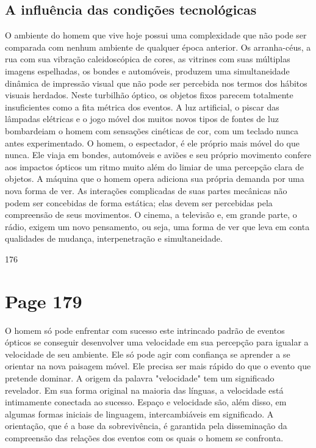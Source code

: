 \documentclass[a4paper]{article}
\begin{document}
\subsection*{A influência das condições tecnológicas}

O ambiente do homem que vive hoje possui uma complexidade que não pode ser comparada com nenhum ambiente de qualquer época anterior. Os arranha-céus, a rua com sua vibração caleidoscópica de cores, as vitrines com suas múltiplas imagens espelhadas, os bondes e automóveis, produzem uma simultaneidade dinâmica de impressão visual que não pode ser percebida nos termos dos hábitos visuais herdados. Neste turbilhão óptico, os objetos fixos parecem totalmente insuficientes como a fita métrica dos eventos. A luz artificial, o piscar das lâmpadas elétricas e o jogo móvel dos muitos novos tipos de fontes de luz bombardeiam o homem com sensações cinéticas de cor, com um teclado nunca antes experimentado. O homem, o espectador, é ele próprio mais móvel do que nunca. Ele viaja em bondes, automóveis e aviões e seu próprio movimento confere aos impactos ópticos um ritmo muito além do limiar de uma percepção clara de objetos. A máquina que o homem opera adiciona sua própria demanda por uma nova forma de ver. As interações complicadas de suas partes mecânicas não podem ser concebidas de forma estática; elas devem ser percebidas pela compreensão de seus movimentos. O cinema, a televisão e, em grande parte, o rádio, exigem um novo pensamento, ou seja, uma forma de ver que leva em conta qualidades de mudança, interpenetração e simultaneidade.

176

\newpage
\section*{Page 179}

O homem só pode enfrentar com sucesso este intrincado padrão de eventos ópticos se conseguir desenvolver uma velocidade em sua percepção para igualar a velocidade de seu ambiente. Ele só pode agir com confiança se aprender a se orientar na nova paisagem móvel. Ele precisa ser mais rápido do que o evento que pretende dominar. A origem da palavra "velocidade" tem um significado revelador. Em sua forma original na maioria das línguas, a velocidade está intimamente conectada ao sucesso. Espaço e velocidade são, além disso, em algumas formas iniciais de linguagem, intercambiáveis em significado. A orientação, que é a base da sobrevivência, é garantida pela disseminação da compreensão das relações dos eventos com os quais o homem se confronta.
\end{document}
